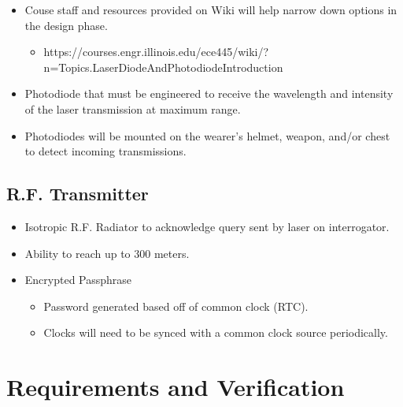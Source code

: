 \documentclass[openbib,letterpaper,10pt]{article}
\begin{document}
\begin{spacing}{1.15}
\begin{itemize}
	\item Couse staff and resources provided on Wiki will help narrow down options in the design phase.
	\begin{itemize}
		\item https://courses.engr.illinois.edu/ece445/wiki/?n=Topics.LaserDiodeAndPhotodiodeIntroduction
	\end{itemize}
	\item Photodiode that must be engineered to receive the wavelength and intensity of the laser transmission at maximum range. 
	\item Photodiodes will be mounted on the wearer's helmet, weapon, and/or chest to detect incoming transmissions.
\end{itemize}
 
 \subsection*{{\normalsize  R.F. Transmitter}}
  \begin{itemize}
  	\item Isotropic R.F. Radiator to acknowledge query sent by laser on interrogator.
  	\item Ability to reach up to 300 meters.
  	\item Encrypted Passphrase
  	\begin{itemize}
  		\item Password generated based off of common clock (RTC).
  		\item Clocks will need to be synced with a common clock source periodically.
  	\end{itemize}
  \end{itemize}
 

  \clearpage


\section{Requirements and Verification}



\end{spacing}
\end{document}
